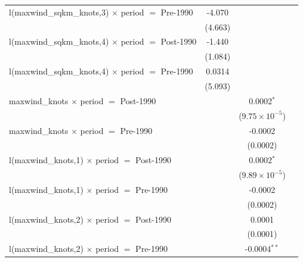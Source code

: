 \begin{tabular}{lccc}
   l(maxwind\_sqkm\_knots,3) $\times$ period $=$ Pre-1990     & -4.070         &                         &   \\   
                                                              & (4.663)        &                         &   \\   
   l(maxwind\_sqkm\_knots,4) $\times$ period $=$ Post-1990    & -1.440         &                         &   \\   
                                                              & (1.084)        &                         &   \\   
   l(maxwind\_sqkm\_knots,4) $\times$ period $=$ Pre-1990     & 0.0314         &                         &   \\   
                                                              & (5.093)        &                         &   \\   
   maxwind\_knots $\times$ period $=$ Post-1990               &                & 0.0002$^{*}$            &   \\   
                                                              &                & ($9.75\times 10^{-5}$)  &   \\   
   maxwind\_knots $\times$ period $=$ Pre-1990                &                & -0.0002                 &   \\   
                                                              &                & (0.0002)                &   \\   
   l(maxwind\_knots,1) $\times$ period $=$ Post-1990          &                & 0.0002$^{*}$            &   \\   
                                                              &                & ($9.89\times 10^{-5}$)  &   \\   
   l(maxwind\_knots,1) $\times$ period $=$ Pre-1990           &                & -0.0002                 &   \\   
                                                              &                & (0.0002)                &   \\   
   l(maxwind\_knots,2) $\times$ period $=$ Post-1990          &                & 0.0001                  &   \\   
                                                              &                & (0.0001)                &   \\   
   l(maxwind\_knots,2) $\times$ period $=$ Pre-1990           &                & -0.0004$^{**}$          &   \\   

\end{tabular}
